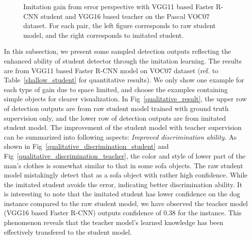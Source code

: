 \documentclass[10pt,twocolumn,letterpaper]{article}
\begin{document}
\begin{figure*}[!t]
				\caption{Imitation gain from error perspective with VGG11 based Faster R-CNN student and VGG16 based teacher on the Pascal VOC07 dataset. For each pair, the left figure corresponds to raw student model, and the right corresponds to imitated student.}
							\label{error_analysis_imitated_non_imitated} 
							\vspace{-3mm}
						\end{figure*}
In this subsection, we present some sampled detection outputs reflecting the enhanced ability of student detector through the imitation learning. The results are from VGG11 based Faster R-CNN model on VOC07 dataset (ref. to Table~\ref{shallow_student} for quantitative results). We only show one example for each type of gain due to space limited, and choose the examples containing simple objects for clearer visualization. In Fig~\ref{qualitative_result}, the upper row of detection outputs are from raw student model trained with ground truth supervision only, and the lower row of detection outputs are from imitated student model. The improvement of the student model with teacher supervision can be summarized into following aspects:
\emph{Improved discrimination ability.} As shown in Fig~\ref{qualitative_discrimination_student} and Fig~\ref{qualitative_discrimination_teacher}, the color and style of lower part of the man's clothes is somewhat similar to that in some sofa objects. The raw student model mistakingly detect that as a sofa object with rather high confidence. While the imitated student avoids the error, indicating better discrimination ability. It is interesting to note that the imitated student has lower confidence on the dog instance compared to the raw student model, we have observed the teacher model (VGG16 based Faster R-CNN) outputs confidence of 0.38 for the instance. This phenomenon reveals that the teacher model's learned knowledge has been effectively transfered to the student model.
\end{document}
